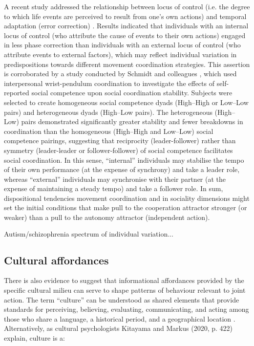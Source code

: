 \begin{CJK}{UTF8}{gbsn}
A recent study addressed the relationship between locus of control (i.e. the degree to which life events are perceived to result from one’s own actions) and temporal adaptation (error correction) \citep{Fairhurst2014}.   Results indicated that individuals with an internal locus of control (who attribute the cause of events to their own actions) engaged in less phase correction than individuals with an external locus of control (who attribute events to external factors), which may reflect individual variation in predispositions towards different movement coordination strategies.  This assertion is corroborated by a study conducted by Schmidt and colleagues \textcite{Schmidt1994}, which used interpersonal wrist-pendulum coordination to investigate the effects of self-reported social competence \citep{Riggio1996} upon social coordination stability.  Subjects were selected to create homogeneous social competence dyads (High–High or Low–Low pairs) and heterogeneous dyads (High–Low pairs). The heterogeneous (High–Low) pairs demonstrated significantly greater stability and fewer breakdowns in coordination than the homogeneous (High–High and Low–Low) social competence pairings, suggesting that reciprocity (leader-follower) rather than symmetry (leader-leader or follower-follower) of social competence facilitates social coordination.  In this sense,  ``internal'' individuals may stabilise the tempo of their own performance (at the expense of synchrony) and take a leader role, whereas ``external'' individuals may synchronise with their partner (at the expense of maintaining a steady tempo) and take a follower role.  In sum,  dispositional tendencies movement coordination and in sociality dimensions might set the initial conditions that make pull to the cooperation attractor stronger (or weaker) than a pull to the autonomy attractor (independent action).

Autism/schizophrenia spectrum of individual variation...


  \subsection{Cultural affordances}

There is also evidence to suggest that informational affordances provided by the specific cultural milieu can serve to shape patterns of behaviour relevant to joint action. The term ``culture'' can be understood as shared elements that provide standards for perceiving, believing, evaluating, communicating, and acting among those who share a language, a historical period, and a geographical location \citep{Triandis1996}.  Alternatively, as cultural psychologists Kitayama and Markus (2020, p. 422) explain, culture is a:


\end{CJK}
